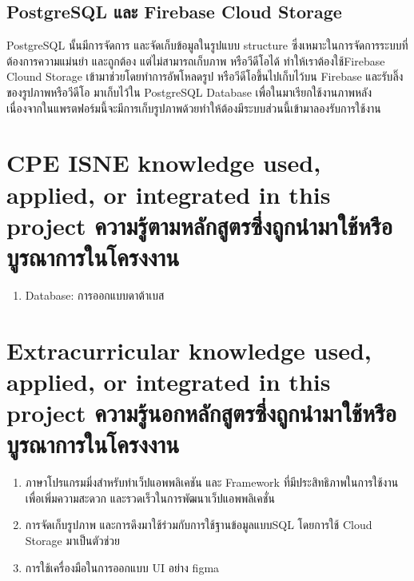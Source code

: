 \subsection{PostgreSQL และ Firebase Cloud Storage}
PostgreSQL นั้นมีการจัดการ และจัดเก็บข้อมูลในรูปแบบ structure ซึ่งเหมาะในการจัดการระบบที่ต้องการความแม่นยำ และถูกต้อง
แต่ไม่สามารถเก็บภาพ หรือวีดีโอได้ ทำให้เราต้องใช้Firebase Clound Storage เข้ามาช่วยโดยทำการอัพโหลดรูป หรือวีดีโอขึ้นไปเก็บไว้บน Firebase และรับลิ๊งของรูปภาพหรือวีดีโอ
มาเก็บไว้ใน PostgreSQL Database เพื่อในมาเรียกใช้งานภาพหลัง เนื่องจากในแพรตฟอร์มนี้จะมีการเก็บรูปภาพด้วยทำให้ต้องมีระบบส่วนนี้เข้ามาลองรับการใช้งาน

\section{\ifenglish%
\ifcpe CPE \else ISNE \fi knowledge used, applied, or integrated in this project
\else%
ความรู้ตามหลักสูตรซึ่งถูกนำมาใช้หรือบูรณาการในโครงงาน
\fi
}

\begin{enumerate}
    \item Database: การออกแบบดาต้าเบส
\end{enumerate}

\section{\ifenglish%
Extracurricular knowledge used, applied, or integrated in this project
\else%
ความรู้นอกหลักสูตรซึ่งถูกนำมาใช้หรือบูรณาการในโครงงาน
\fi
}

\begin{enumerate}
    \item ภาษาโปรแกรมมิ่งสำหรับทำเว็ปแอพพลิเคชัน และ Framework ที่มีประสิทธิภาพในการใช้งานเพื่อเพิ่มความสะดวก และรวดเร็วในการพัฒนาเว็ปแอพพลิเคชั่น
    \item การจัดเก็บรูปภาพ และการดึงมาใช้ร่วมกับการใช้ฐานข้อมูลแบบSQL โดยการใช้ Cloud Storage มาเป็นตัวช่วย
    \item การใช้เครื่องมือในการออกแบบ UI อย่าง figma
\end{enumerate}